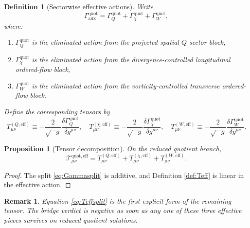\documentclass[11pt]{article}
\newcommand{\EffAux}{\mathcal T_{\mu\nu}^{\mathrm{quot,eff}}}
\newtheorem{definition}{Definition}
\newtheorem{proposition}{Proposition}
\newtheorem{remark}{Remark}
\begin{document}
\begin{definition}[Sectorwise effective actions]
\label{def:split}
Write
\begin{equation}
\Gamma_{\mathrm{aux}}^{\mathrm{quot}}
=
\Gamma_Q^{\mathrm{quot}}
+\Gamma_\chi^{\mathrm{quot}}
+\Gamma_W^{\mathrm{quot}},
\label{eq:Gammasplit}
\end{equation}
where:
\begin{enumerate}
    \item \(\Gamma_Q^{\mathrm{quot}}\) is the eliminated action from the projected spatial \(Q\)-sector block,
    \item \(\Gamma_\chi^{\mathrm{quot}}\) is the eliminated action from the divergence-controlled longitudinal ordered-flow block,
    \item \(\Gamma_W^{\mathrm{quot}}\) is the eliminated action from the vorticity-controlled transverse ordered-flow block.
\end{enumerate}
Define the corresponding tensors by
\begin{equation}
T_{\mu\nu}^{(Q,\mathrm{eff})}
\equiv
-\frac{2}{\sqrt{-g}}
\frac{\delta\Gamma_Q^{\mathrm{quot}}}{\delta g^{\mu\nu}},
\quad
T_{\mu\nu}^{(\chi,\mathrm{eff})}
\equiv
-\frac{2}{\sqrt{-g}}
\frac{\delta\Gamma_\chi^{\mathrm{quot}}}{\delta g^{\mu\nu}},
\quad
T_{\mu\nu}^{(W,\mathrm{eff})}
\equiv
-\frac{2}{\sqrt{-g}}
\frac{\delta\Gamma_W^{\mathrm{quot}}}{\delta g^{\mu\nu}}.
\label{eq:Tsplit}
\end{equation}
\end{definition}

\begin{proposition}[Tensor decomposition]
\label{prop:Tsplit}
On the reduced quotient branch,
\begin{equation}
\EffAux
=
T_{\mu\nu}^{(Q,\mathrm{eff})}
+T_{\mu\nu}^{(\chi,\mathrm{eff})}
+T_{\mu\nu}^{(W,\mathrm{eff})}.
\label{eq:Teffsplit}
\end{equation}
\end{proposition}

\begin{proof}
The split \eqref{eq:Gammasplit} is additive, and Definition \ref{def:Teff} is linear in the effective action.
\end{proof}

\begin{remark}
Equation \eqref{eq:Teffsplit} is the first explicit form of the remaining tensor. The bridge verdict is negative as soon as any one of these three effective pieces survives on reduced quotient solutions.
\end{remark}
\end{document}
